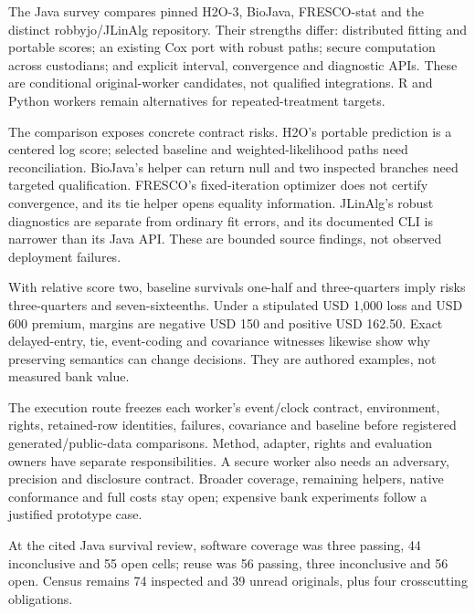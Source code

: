 The Java survey compares pinned H2O-3, BioJava, FRESCO-stat and the
distinct robbyjo/JLinAlg repository. Their strengths differ: distributed
fitting and portable scores; an existing Cox port with robust paths;
secure computation across custodians; and explicit interval, convergence
and diagnostic APIs. These are conditional original-worker candidates,
not qualified integrations. R and Python workers remain alternatives for
repeated-treatment targets.
\citep{exec24_longjava_h2o,exec24_longjava_biojava,exec24_longjava_fresco,exec24_longjava_jlinalg}

The comparison exposes concrete contract risks. H2O's portable
prediction is a centered log score; selected baseline and
weighted-likelihood paths need reconciliation. BioJava's helper can
return null and two inspected branches need targeted qualification.
FRESCO's fixed-iteration optimizer does not certify convergence, and its
tie helper opens equality information. JLinAlg's robust diagnostics are
separate from ordinary fit errors, and its documented CLI is narrower
than its Java API. These are bounded source findings, not observed
deployment failures.
\citep{exec24_longjava_h2o,exec24_longjava_biojava,exec24_longjava_fresco,exec24_longjava_jlinalg}

With relative score two, baseline survivals one-half and three-quarters
imply risks three-quarters and seven-sixteenths. Under a stipulated USD
1,000 loss and USD 600 premium, margins are negative USD 150 and
positive USD 162.50. Exact delayed-entry, tie, event-coding and
covariance witnesses likewise show why preserving semantics can change
decisions. They are authored examples, not measured bank value.
\citep{exec24_longjava_reference}

The execution route freezes each worker's event/clock contract,
environment, rights, retained-row identities, failures, covariance and
baseline before registered generated/public-data comparisons. Method,
adapter, rights and evaluation owners have separate responsibilities. A
secure worker also needs an adversary, precision and disclosure
contract. Broader coverage, remaining helpers, native conformance and
full costs stay open; expensive bank experiments follow a justified
prototype case.

At the cited Java survival review, software coverage was three passing,
44 inconclusive and 55 open cells; reuse was 56 passing, three
inconclusive and 56 open. Census remains 74 inspected and 39 unread
originals, plus four crosscutting obligations.
\citep{sp24longjava_reader,sp24longjava_progress}

